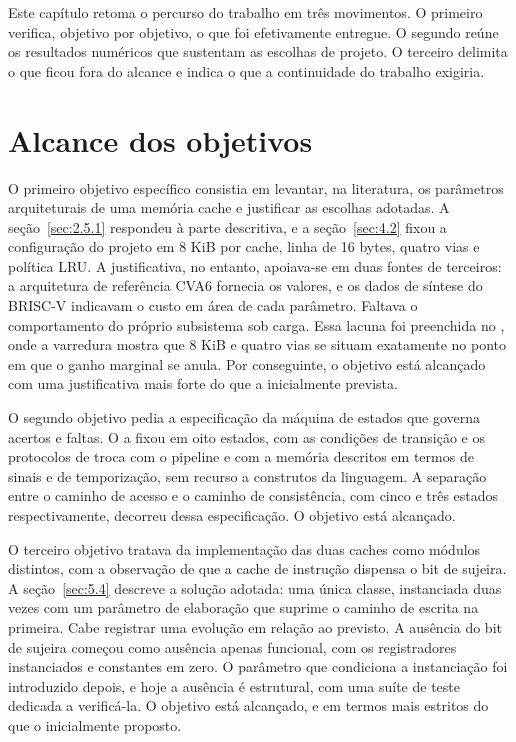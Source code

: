 Este capítulo retoma o percurso do trabalho em três movimentos. O primeiro verifica, objetivo por objetivo, o que foi efetivamente entregue. O segundo reúne os resultados numéricos que sustentam as escolhas de projeto. O terceiro delimita o que ficou fora do alcance e indica o que a continuidade do trabalho exigiria.

\section{Alcance dos objetivos}\label{sec:7.1}

O primeiro objetivo específico consistia em levantar, na literatura, os parâmetros arquiteturais de uma memória cache e justificar as escolhas adotadas. A seção~\ref{sec:2.5.1} respondeu à parte descritiva, e a seção~\ref{sec:4.2} fixou a configuração do projeto em 8 KiB por cache, linha de 16 bytes, quatro vias e política LRU. A justificativa, no entanto, apoiava-se em duas fontes de terceiros: a arquitetura de referência CVA6 fornecia os valores, e os dados de síntese do BRISC-V indicavam o custo em área de cada parâmetro. Faltava o comportamento do próprio subsistema sob carga. Essa lacuna foi preenchida no , onde a varredura mostra que 8 KiB e quatro vias se situam exatamente no ponto em que o ganho marginal se anula. Por conseguinte, o objetivo está alcançado com uma justificativa mais forte do que a inicialmente prevista.

O segundo objetivo pedia a especificação da máquina de estados que governa acertos e faltas. O  a fixou em oito estados, com as condições de transição e os protocolos de troca com o pipeline e com a memória descritos em termos de sinais e de temporização, sem recurso a construtos da linguagem. A separação entre o caminho de acesso e o caminho de consistência, com cinco e três estados respectivamente, decorreu dessa especificação. O objetivo está alcançado.

O terceiro objetivo tratava da implementação das duas caches como módulos distintos, com a observação de que a cache de instrução dispensa o bit de sujeira. A seção~\ref{sec:5.4} descreve a solução adotada: uma única classe, instanciada duas vezes com um parâmetro de elaboração que suprime o caminho de escrita na primeira. Cabe registrar uma evolução em relação ao previsto. A ausência do bit de sujeira começou como ausência apenas funcional, com os registradores instanciados e constantes em zero. O parâmetro que condiciona a instanciação foi introduzido depois, e hoje a ausência é estrutural, com uma suíte de teste dedicada a verificá-la. O objetivo está alcançado, e em termos mais estritos do que o inicialmente proposto.

